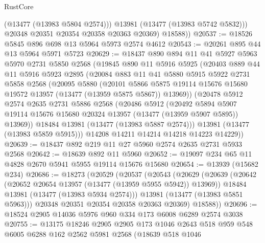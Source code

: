 \begin{lexlean}{RustCore}
\begin{coremodule}
              (@13477 (@13983 @5804 @2574)))
            @13981
            (@13477 (@13983 @5742 @5832)))
          @20348
          @20351
          @20354
          @20358
          @20363
          @20369)
        @18588))
@20537 := @18526 @5845 @896 @698 @13 @5964 @5973 @2574 @4612
@20543 := @20261 @895 @44 @13 @5964 @5971 @5723
@20629 := @18437
    @890
    @894
    @11
    @41
    @5927
    @5963
    @5970
    @2731
    @5850
    @2568
    (@19845
      @890
      @11
      @5916
      @5925
      (@20403
        @889
        @44
        @11
        @5916
        @5923
        @2895
        (@20084
          @883
          @11
          @41
          @5880
          @5915
          @5922
          @2731
          @5858
          @2568
          (@20095
            @5880
            (@20101
              @5866
              @5875
              @19114
              @15676
              @15680
              @19572
              @13957
              (@13477 (@13959 @5875 @5867))
              @13969))
          (@20478
            @5912
            @2574
            @2635
            @2731
            @5886
            @2568
            (@20486
              @5912
              (@20492
                @5894
                @5907
                @19114
                @15676
                @15680
                @20324
                @13957
                (@13477 (@13959 @5907 @5895))
                @13969))
            @18484
            @13981
            (@13477 (@13983 @5887 @2574)))
          @13981
          (@13477 (@13983 @5859 @5915)))
        @14208
        @14211
        @14214
        @14218
        @14223
        @14229))
@20639 := @18437 @892 @219 @11 @27 @5960 @2574 @2635 @2731 @5933 @2568
@20642 := @18639 @892 @11 @5960
@20652 := @19097 @234 @65 @11 @4828 @2670 @5941 @5955 @19114 @15676 @15680
@20654 := @13939 (@15682 @234)
@20686 := @18273
    (@20529
      (@20537
        (@20543
          (@20629
            (@20639
              (@20642 (@20652 @20654 @13957 (@13477 (@13959 @5955 @5942)) @13969))
              @18484
              @13981
              (@13477 (@13983 @5934 @2574)))
            @13981
            (@13477 (@13983 @5851 @5963)))
          @20348
          @20351
          @20354
          @20358
          @20363
          @20369)
        @18588))
@20696 := @18524 @2905 @14036 @5976 @960 @334 @173 @6008 @6289 @2574 @3038
@20755 := @13175
    @18246
    @2905
    @2905
    @173
    @1046
    @2643
    @518
    @959
    @548
    @6005
    @6288
    @162
    @2562
    @5981
    @2568
    (@18639
      @518
      @1046

\end{coremodule}
\end{lexlean}
